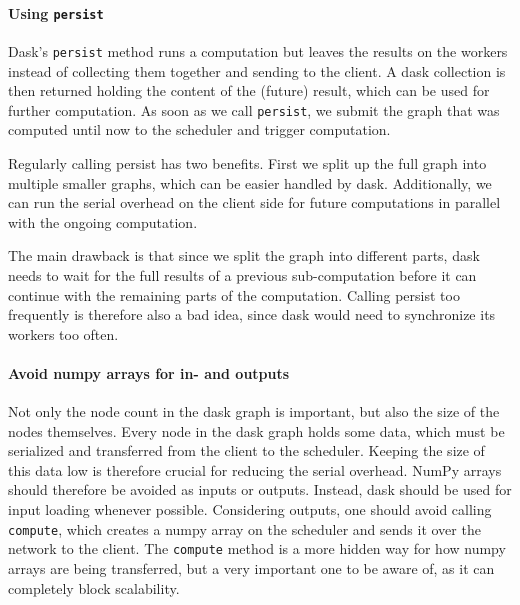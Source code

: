 \paragraph{Using \lstinline{persist}}

Dask's \lstinline{persist} method runs a computation but leaves the results on the workers instead of collecting them together and sending to the client.
A dask collection is then returned holding the content of the (future) result, which can be used for further computation.
As soon as we call \lstinline{persist}, we submit the graph that was computed until now to the scheduler and trigger computation.

Regularly calling persist has two benefits.
First we split up the full graph into multiple smaller graphs, which can be easier handled by dask.
Additionally, we can run the serial overhead on the client side for future computations in parallel with the ongoing computation.

The main drawback is that since we split the graph into different parts, dask needs to wait for the full results of a previous sub-computation before it can continue with the remaining parts of the computation.
Calling persist too frequently is therefore also a bad idea, since dask would need to synchronize its workers too often.

\paragraph{Avoid numpy arrays for in- and outputs}

Not only the node count in the dask graph is important, but also the size of the nodes themselves.
Every node in the dask graph holds some data, which must be serialized and transferred from the client to the scheduler. Keeping the size of this data low is therefore crucial for reducing the serial overhead.
NumPy arrays should therefore be avoided as inputs or outputs.
Instead, dask should be used for input loading whenever possible.
Considering outputs, one should avoid calling \lstinline{compute}, which creates a numpy array on the scheduler and sends it over the network to the client.
The \lstinline{compute} method is a more hidden way for how numpy arrays are being transferred, but a very important one to be aware of, as it can completely block scalability.